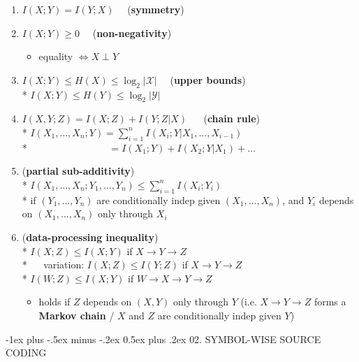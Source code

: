 \documentclass[10pt, landscape]{article}
\makeatletter
\renewcommand{\section}{\@startsection{section}{1}{0mm}%
  {-1ex plus -.5ex minus -.2ex}%
  {0.5ex plus .2ex}%
{\normalfont\large\bfseries}}
\makeatother
\begin{document}
\begin{multicols*}{4}
  \begin{enumerate}
    \item $I(X; Y) = I(Y;X) \quad$ (\textbf{symmetry})
    \item $I(X;Y) \geq 0 \quad $ (\textbf{non-negativity})
      \begin{itemize}
        \item equality $\iff X \perp Y$
      \end{itemize}
    \item $I(X;Y) \leq H(X) \leq \log_2 \vert \mathcal{X} \vert \quad$ (\textbf{upper bounds}) 
      \\* $I(X;Y) \leq H(Y) \leq \log_2 \vert \mathcal{Y} \vert$
    \item  $I(X,Y;Z) = I(X;Z) + I(Y;Z\vert X)$ $\quad$ (\textbf{chain rule})
      \\* \( {\displaystyle{ I(X_1, \dots, X_n;Y) = \sum^n_{i=1} I(X_i; Y \vert X_1, \dots, X_{i-1}) }} \) 
      \\* $ \quad\quad\quad\quad\quad\quad\quad\quad = I(X_1;Y) + I(X_2;Y \vert X_1) + \dots$
    \item (\textbf{partial sub-additivity}) 
      \\*  \( {\displaystyle{ I(X_1, \dots, X_n; Y_1, \dots, Y_n) \leq \sum^n_{i=1} I(X_i;Y_i) }} \) 
      \\* if $(Y_1, {\scriptscriptstyle\dots}, Y_n)$ are conditionally indep given $(X_1, {\scriptscriptstyle\dots}, X_n)$, and $Y_i$ depends on $(X_1, {\scriptscriptstyle\dots}, X_n)$ only through $X_i$
    \item (\textbf{data-processing inequality})
      \\* $I(X;Z) \leq I(X;Y)$ if $X \rightarrow Y \rightarrow Z$
      \\* $\quad$ variation: $I(X;Z) \leq I(Y;Z)$ if $X \rightarrow Y \rightarrow Z$
      \\* $I(W;Z) \leq I(X;Y)$ if $W \rightarrow X \rightarrow Y \rightarrow Z$ $\quad$  
      \begin{itemize}
        \item holds if $Z$ depends on $(X, Y)$ only through $Y$ (i.e. $X \rightarrow Y \rightarrow Z$ forms a \textbf{Markov chain} / $X$ and $Z$ are conditionally indep given $Y$)
      \end{itemize}
  \end{enumerate}


  \section{02. SYMBOL-WISE SOURCE CODING}


\end{multicols*}
\end{document}
